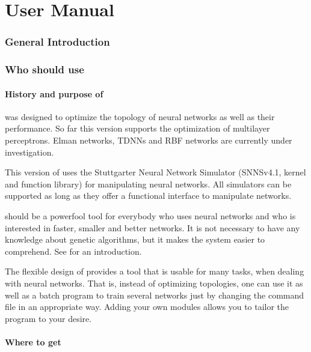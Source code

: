 

\part{\ENZO User Manual} %


\section{General Introduction}



\section{Who should use \ENZO}

\subsection{History and purpose of \ENZO}

\ENZO was designed to optimize the topology of neural networks as well
as their performance. So far this version supports the optimization of
multilayer perceptrons. Elman networks, TDNNs and RBF networks are currently
under investigation. 


This version of \ENZO uses the Stuttgarter Neural Network Simulator (SNNSv4.1,
kernel and function library)
for manipulating neural networks. All simulators can be supported as long
as they offer a functional interface to manipulate networks.

\ENZO should be a powerfool tool for everybody who uses neural networks
and who is interested in faster, smaller and better networks. 
It is not necessary to have any knowledge about genetic algorithms,
but it makes the system easier to comprehend. See \cite{goldberg89,reeves93_2,schwefel95} for an
introduction.

The flexible design of \ENZO provides a tool that is usable for many tasks, when
dealing with neural networks. That is, instead of optimizing topologies, one can use
it as well as a batch program to train several networks just  by changing the
command file
in an appropriate way. Adding your own modules allows you to tailor the program
to your desire.

\subsection{Where to get \ENZO}


